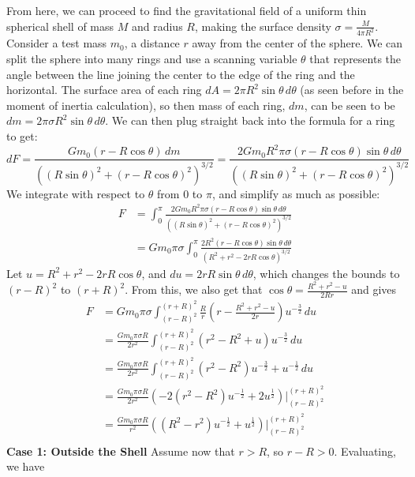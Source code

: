 From here, we can proceed to find the gravitational field of a uniform thin spherical shell of mass $M$ and radius $R$, making the surface density $\sigma = \frac{M}{4\pi R^2}$. Consider a test mass $m_0$, a distance $r$ away from the center of the sphere. We can split the sphere into many rings and use a scanning variable $\theta$ that represents the angle between the line joining the center to the edge of the ring and the horizontal. The surface area of each ring $dA = 2\pi R^2 \sin \theta \, d\theta$ (as seen before in the moment of inertia calculation), so then mass of each ring, $dm$, can be seen to be $dm = 2\pi \sigma R^2 \sin \theta \, d\theta$. We can then plug straight back into the formula for a ring to get: 
\[
    dF = \frac{Gm_0(r-R\cos \theta)\, dm}{((R\sin \theta)^2 + (r-R\cos \theta)^2)^{3/2}} = \frac{2Gm_0R^2 \pi \sigma (r-R\cos \theta) \sin \theta \, d\theta}{((R\sin \theta)^2 + (r-R\cos \theta)^2)^{3/2}}
\]
We integrate with respect to $\theta$ from $0$ to $\pi$, and simplify as much as possible: 
\begin{align*}
    F &= \int_0^\pi \frac{2Gm_0R^2 \pi \sigma (r-R\cos \theta) \sin \theta \, d\theta}{((R\sin \theta)^2 + (r-R\cos \theta)^2)^{3/2}}\\
    &= Gm_0\pi\sigma \int_0^\pi \frac{2R^2 (r-R\cos \theta) \sin \theta \, d\theta}{(R^2 + r^2 - 2rR\cos \theta)^{3/2}}
\end{align*}
Let $u = R^2 + r^2 - 2rR\cos \theta$, and $du = 2rR \sin \theta \, d\theta$, which changes the bounds to $(r-R)^2$ to $(r+R)^2$. From this, we also get that $\cos \theta = \frac{R^2+r^2-u}{2Rr}$ and gives
\begin{align*}
    F &= Gm_0\pi\sigma \int_{(r-R)^2}^{(r+R)^2} \frac{R}{r} \left(r-\frac{R^2+r^2-u}{2r}\right) u^{-\frac{3}{2}}\, du \\
    &= \frac{Gm_0\pi\sigma R}{2r^2} \int_{(r-R)^2}^{(r+R)^2} (r^2-R^2+u) u^{-\frac{3}{2}}\, du \\
    &= \frac{Gm_0\pi\sigma R}{2r^2} \int_{(r-R)^2}^{(r+R)^2} (r^2-R^2)u^{-\frac{3}{2}} + u^{-\frac{1}{2}}\, du \\
    &= \frac{Gm_0\pi\sigma R}{2r^2} (-2(r^2-R^2)u^{-\frac{1}{2}} + 2u^{\frac{1}{2}}) \Big|_{(r-R)^2}^{(r+R)^2} \\
    &= \frac{Gm_0\pi\sigma R}{r^2} ((R^2-r^2)u^{-\frac{1}{2}} + u^{\frac{1}{2}}) \Big|_{(r-R)^2}^{(r+R)^2}\\
\end{align*}
\textbf{Case 1: Outside the Shell} \newline
Assume now that $r > R$, so $r - R> 0$. Evaluating, we have
